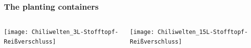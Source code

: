 \documentclass[
    12pt,
    aspectratio=1610,
    b,
    bibliography=../bibliography.bib,
    link-citations]{beamer}
\begin{document}
    \begin{frame}
        \frametitle{The planting containers}
        \begin{columns}[T]
            \begin{column}{.45\textwidth}
                \texttt{[image: Chiliwelten\_3L-Stofftopf-Reißverschluss]}
            \end{column}
            \begin{column}{.45\textwidth}
                \texttt{[image: Chiliwelten\_15L-Stofftopf-Reißverschluss]}
            \end{column}
        \end{columns}
    \end{frame}
\end{document}
